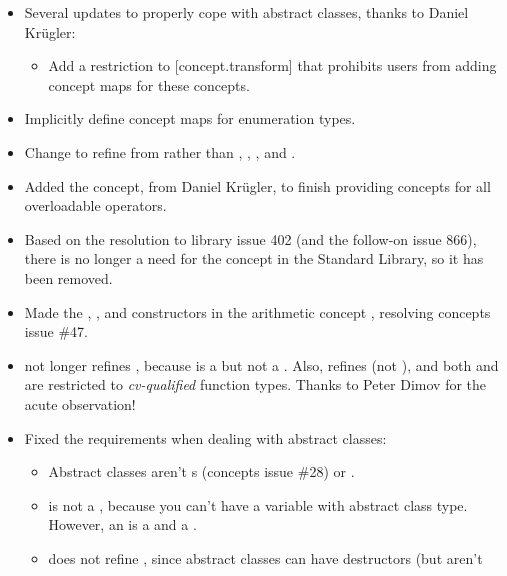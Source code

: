 \documentclass[american,twoside]{book}
\begin{document}
\begin{titlepage}
\begin{itemize}
\item Several updates to properly cope with abstract classes, thanks
  to Daniel Kr\"ugler:
  \begin{itemize}
  \item Add a restriction to [concept.transform] that prohibits users
    from adding concept maps for these concepts.
  \end{itemize}
  \item Implicitly define  concept
    maps for enumeration types.
  \item Change  to refine from
     rather than ,
    , , and
    . 
  \item Added the  
    concept, from Daniel Kr\"ugler, to finish providing concepts for
    all overloadable operators.
  \item Based on the resolution to library issue 402 (and the
    follow-on issue 866), there is no longer a need for the
     concept in the Standard Library, so it has
    been removed.
  \item Made the , , and
     constructors in the arithmetic concept
    , resolving concepts issue \#47.
  \item {} not longer refines
    , because  is a
     but not a . Also,
     refines  (not
    ), and both  and
     are restricted to \emph{cv-qualified}
    function types. Thanks to
    Peter Dimov for the acute observation!
  \item Fixed the requirements when dealing with abstract classes:
    \begin{itemize}
    \item Abstract classes aren't s (concepts
      issue \#28) or .
    \item {} is not a , because
      you can't have a variable with abstract class type. However, an
       is a  and a
      . 
    \item {} does not refine ,
      since abstract classes can have destructors (but aren't

\end{itemize}
\end{itemize}
\end{titlepage}
\end{document}
